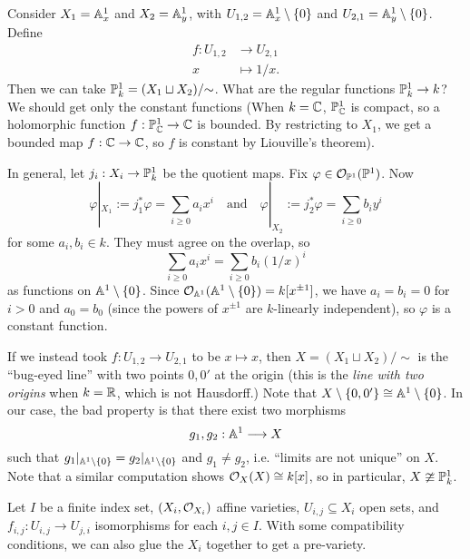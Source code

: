 \begin{example}
  Consider $X_1 = \mathbb{A}^1_x$
  and $X_2 = \mathbb{A}^1_y$, with
  $U_{1, 2} = \mathbb{A}^1_x \setminus \{0\}$
  and $U_{2, 1} = \mathbb{A}^1_y \setminus \{0\}$. Define
  \begin{align*}
    f : U_{1, 2}
    &\longrightarrow U_{2, 1} \\
    x &\longmapsto 1 / x.
  \end{align*}
  Then we can
  take $\mathbb{P}^1_k = (X_1 \sqcup X_2) / {\sim}$.
  What are the regular functions
  $\mathbb{P}^1_k \to k$? We should
  get only the constant functions
  (When $k = \mathbb{C}$,
  $\mathbb{P}^1_{\mathbb{C}}$ is compact, so a
  holomorphic function $f : \mathbb{P}^1_{\mathbb{C}} \to \mathbb{C}$
  is bounded. By restricting to $X_1$,
  we get a bounded map
  $f : \mathbb{C} \to \mathbb{C}$, so $f$ is constant
  by Liouville's theorem).

  In general,  let $j_i : X_i \to \mathbb{P}^1_k$
  be the quotient maps. Fix
  $\varphi \in \mathcal{O}_{\mathbb{P}^1}(\mathbb{P}^1)$.
  Now
  \[
    \varphi|_{X_1} := j_1^* \varphi
    = \sum_{i \ge 0} a_i x^i \quad
    \text{and} \quad
    \varphi|_{X_2} := j_2^* \varphi
    = \sum_{i \ge 0} b_i y^i
  \]
  for some $a_i, b_i \in k$.
  They must agree on the overlap, so
  \[
    \sum_{i \ge 0} a_i x^i
    = \sum_{i \ge 0} b_i (1 / x)^i
  \]
  as functions on $\mathbb{A}^1 \setminus \{0\}$.
  Since $\mathcal{O}_{\mathbb{A}^1}(\mathbb{A}^1 \setminus \{0\}) = k[x^{\pm 1}]$,
  we have $a_i = b_i = 0$ for
  $i > 0$ and $a_0 = b_0$ (since
  the powers of $x^{\pm 1}$ are $k$-linearly
  independent), so
  $\varphi$ is a constant function.

  If we instead took
  $f : U_{1, 2} \to U_{2, 1}$ to be
  $x \mapsto x$, then
  $X = (X_1 \sqcup X_2) / {\sim}$
  is the ``bug-eyed line'' with
  two points $0, 0'$ at the origin (this is
  the \emph{line with two origins} when
  $k = \mathbb{R}$, which is not Hausdorff.)
  Note that $X \setminus \{0, 0'\} \cong \mathbb{A}^1 \setminus \{0\}$.
  In our case, the bad property is
  that there exist two morphisms
  \[
    g_1, g_2 : \mathbb{A}^1 \longrightarrow X
  \]
  such that $g_1|_{\mathbb{A}^1 \setminus \{0\}} = g_2|_{\mathbb{A}^1 \setminus \{0\}}$
  and $g_1 \ne g_2$, i.e.
  ``limits are not unique'' on $X$.
  Note that a similar computation shows
  $\mathcal{O}_X(X) \cong k[x]$, so in particular,
  $X \ncong \mathbb{P}^1_k$.
\end{example}

\begin{example}
  Let $I$ be a finite index set,
  $(X_i, \mathcal{O}_{X_i})$ affine varieties,
  $U_{i, j} \subseteq X_i$ open sets, and
  $f_{i, j} : U_{i, j} \to U_{j, i}$
  isomorphisms
  for each $i, j \in I$. With some
  compatibility conditions, we can also
  glue the $X_i$ together to get
  a pre-variety.
\end{example}

